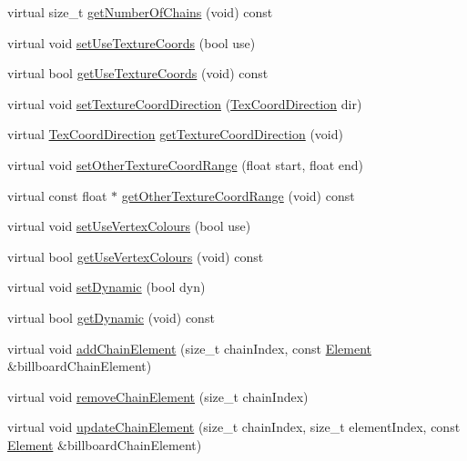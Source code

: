 \begin{DoxyCompactItemize}
\item 
virtual size\+\_\+t \hyperlink{classPUBillboardChain_acd50f9bc6f78acb7138e85f0b0cf1f0f}{get\+Number\+Of\+Chains} (void) const
\item 
virtual void \hyperlink{classPUBillboardChain_a21246c9c1acfe3e89f0c74f9057bc2ba}{set\+Use\+Texture\+Coords} (bool use)
\item 
virtual bool \hyperlink{classPUBillboardChain_a1dbfd007093aa2f03f3f0a3f114a7711}{get\+Use\+Texture\+Coords} (void) const
\item 
virtual void \hyperlink{classPUBillboardChain_a0022ca3d4fbf8a04879eed49872e520a}{set\+Texture\+Coord\+Direction} (\hyperlink{classPUBillboardChain_a6ebaec09a615199356b9d50fdab2209f}{Tex\+Coord\+Direction} dir)
\item 
virtual \hyperlink{classPUBillboardChain_a6ebaec09a615199356b9d50fdab2209f}{Tex\+Coord\+Direction} \hyperlink{classPUBillboardChain_ae122ca85af280539d493f39ea656a0b4}{get\+Texture\+Coord\+Direction} (void)
\item 
virtual void \hyperlink{classPUBillboardChain_a391106bfa62a93600afce5bdb94c23a1}{set\+Other\+Texture\+Coord\+Range} (float start, float end)
\item 
virtual const float $\ast$ \hyperlink{classPUBillboardChain_af17d5dd54f8ef5331ef2613ca937b199}{get\+Other\+Texture\+Coord\+Range} (void) const
\item 
virtual void \hyperlink{classPUBillboardChain_a4e5aebd96aff64bb21c594f0d7d2355d}{set\+Use\+Vertex\+Colours} (bool use)
\item 
virtual bool \hyperlink{classPUBillboardChain_adc396aa55a3e980a5d21cd5cbb28005a}{get\+Use\+Vertex\+Colours} (void) const
\item 
virtual void \hyperlink{classPUBillboardChain_a14bf6b30ff77c3497ff35e8b090397ba}{set\+Dynamic} (bool dyn)
\item 
virtual bool \hyperlink{classPUBillboardChain_af302a78ee0a7e43f27c6b15c8851da64}{get\+Dynamic} (void) const
\item 
virtual void \hyperlink{classPUBillboardChain_a38365d5ca4c157b09280dc3a61ab9b63}{add\+Chain\+Element} (size\+\_\+t chain\+Index, const \hyperlink{classPUBillboardChain_1_1Element}{Element} \&billboard\+Chain\+Element)
\item 
virtual void \hyperlink{classPUBillboardChain_a3cf3a2e985beb74ddc5474f2f80846f6}{remove\+Chain\+Element} (size\+\_\+t chain\+Index)
\item 
virtual void \hyperlink{classPUBillboardChain_a1e3189cd65fd7b83bc359a4afd269baa}{update\+Chain\+Element} (size\+\_\+t chain\+Index, size\+\_\+t element\+Index, const \hyperlink{classPUBillboardChain_1_1Element}{Element} \&billboard\+Chain\+Element)

\end{DoxyCompactItemize}
